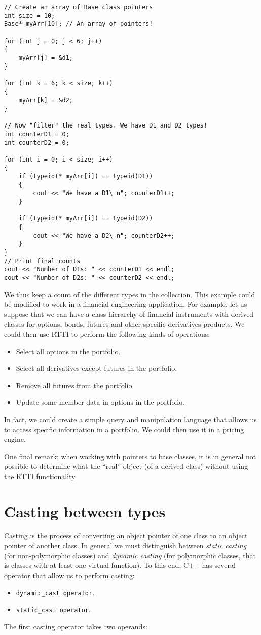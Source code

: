 \begin{lstlisting}
// Create an array of Base class pointers
int size = 10;
Base* myArr[10]; // An array of pointers!

for (int j = 0; j < 6; j++)
{
	myArr[j] = &d1;
}

for (int k = 6; k < size; k++)
{
	myArr[k] = &d2;
}

// Now "filter" the real types. We have D1 and D2 types!
int counterD1 = 0;
int counterD2 = 0;

for (int i = 0; i < size; i++)
{
	if (typeid(* myArr[i]) == typeid(D1))
	{
		cout << "We have a D1\ n"; counterD1++;
	}

	if (typeid(* myArr[i]) == typeid(D2))
	{
		cout << "We have a D2\ n"; counterD2++;
	}
}
// Print final counts
cout << "Number of D1s: " << counterD1 << endl;
cout << "Number of D2s: " << counterD2 << endl;
\end{lstlisting}
We thus keep a count of the different types in the collection. This example could be modified to work in a financial engineering application. For example, let us suppose that we can have a class hierarchy of financial instruments with derived classes for options, bonds, futures and other specific derivatives products. We could then use RTTI to perform the following kinds of operations:
\begin{itemize}
	\item Select all options in the portfolio.
	\item Select all derivatives except futures in the portfolio.
	\item Remove all futures from the portfolio.
	\item Update some member data in options in the portfolio.
\end{itemize}
In fact, we could create a simple query and manipulation language that allows us to access specific information in a portfolio. We could then use it in a pricing engine.

One final remark; when working with pointers to base classes, it is in general not possible to determine what the ``real'' object (of a derived class) without using the RTTI functionality.

\section{Casting between types}

Casting is the process of converting an object pointer of one class to an object pointer of another class. In general we must distinguish between \emph{static casting} (for non-polymorphic classes) and \emph{dynamic casting} (for polymorphic classes, that is classes with at least one virtual function). To this end, C++ has several operator that allow us to perform casting:
\begin{itemize}
	\item \texttt{dynamic\_cast operator}.
	\item \texttt{static\_cast operator}.
\end{itemize}
The first casting operator takes two operands:

